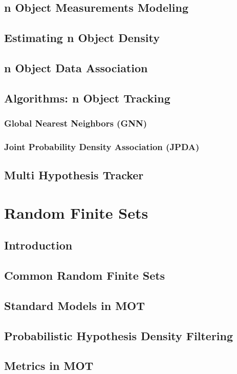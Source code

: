 \documentclass{beamer}
\begin{document}
	\subsection{n Object Measurements Modeling}
	\subsection{Estimating n Object Density}
	\subsection{n Object Data Association}
	\subsection{Algorithms: n Object Tracking}
		\subsubsection{Global Nearest Neighbors (GNN)}
		\subsubsection{Joint Probability Density Association (JPDA)}
	\subsection{Multi Hypothesis Tracker}	
	\section{Random Finite Sets}
	\subsection{Introduction}
	\subsection{Common Random Finite Sets}
	\subsection{Standard Models in MOT}
	\subsection{Probabilistic Hypothesis Density Filtering}
	\subsection{Metrics in MOT}
\end{document}

